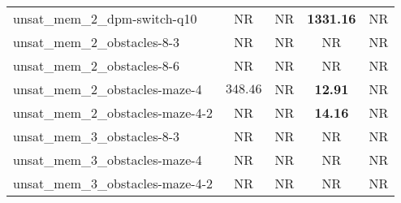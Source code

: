 \begin{tabular}{lcccc}
unsat\_mem\_2\_dpm-switch-q10 & NR & NR & \textbf{1331.16} & NR \\
unsat\_mem\_2\_obstacles-8-3 & NR & NR & NR & NR \\
unsat\_mem\_2\_obstacles-8-6 & NR & NR & NR & NR \\
unsat\_mem\_2\_obstacles-maze-4 & $348.46$ & NR & \textbf{12.91} & NR \\
unsat\_mem\_2\_obstacles-maze-4-2 & NR & NR & \textbf{14.16} & NR \\
unsat\_mem\_3\_obstacles-8-3 & NR & NR & NR & NR \\
unsat\_mem\_3\_obstacles-maze-4 & NR & NR & NR & NR \\
unsat\_mem\_3\_obstacles-maze-4-2 & NR & NR & NR & NR \\
\bottomrule
\end{tabular}
